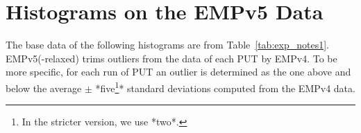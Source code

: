 \documentclass[10pt]{article}
\begin{document}
\newpage

\section{Histograms on the EMPv5 Data~\label{sec:empv5_hist}}
The base data of the following histograms are from Table~\ref{tab:exp_notes1}. 
EMPv5(-relaxed) trims outliers from the data of each PUT by EMPv4.
To be more specific, for each run of PUT an outlier is determined 
as the one above and below the average $\pm$ *five\footnote{In the stricter version, we use *two*.}* 
standard deviations computed from the EMPv4 data.

\begin{figure}[hp!]
	\centering
\end{figure}
\end{document}
